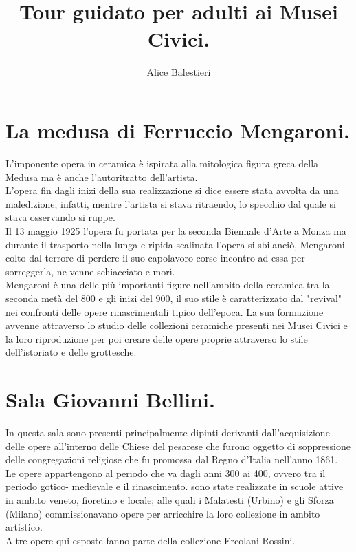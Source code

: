 \documentclass[12pt,a4paper]{article}
\begin{document}
	
	\title{\textbf{\\Tour guidato per adulti ai Musei Civici.}}
	\author{Alice Balestieri}
	\date{}
	
	\maketitle
	\newpage
	
	\tableofcontents
	\newpage
	
	\section{La medusa di Ferruccio Mengaroni.}
	L'imponente opera in ceramica è ispirata alla mitologica figura greca della Medusa ma è anche l’autoritratto dell'artista.\\
	L'opera fin dagli inizi della sua realizzazione si dice essere stata avvolta da una maledizione; infatti, mentre l'artista si stava ritraendo, lo specchio dal quale si stava osservando si ruppe.\\
	Il 13 maggio 1925 l'opera fu portata per la seconda Biennale d'Arte a Monza ma durante il trasporto nella lunga e ripida scalinata l'opera si sbilanciò, Mengaroni colto dal terrore di perdere il suo capolavoro corse incontro ad essa per sorreggerla, ne venne schiacciato e morì.\\
	Mengaroni è una delle più importanti figure nell'ambito della ceramica tra la seconda metà del 800 e gli inizi del 900, il suo stile è caratterizzato dal "revival" nei confronti delle opere rinascimentali tipico dell'epoca. La sua formazione avvenne attraverso lo studio delle collezioni ceramiche presenti nei Musei Civici e la loro riproduzione per poi creare delle opere proprie attraverso lo stile dell'istoriato e delle grottesche.
	
	\section{Sala Giovanni Bellini.}
	In questa sala sono presenti principalmente dipinti derivanti dall'acquisizione delle opere all'interno delle Chiese del pesarese che furono oggetto di soppressione delle congregazioni religiose che fu promossa dal Regno d'Italia nell'anno 1861.\\
	Le opere appartengono al periodo che va dagli anni  300 ai 400, ovvero tra il periodo gotico- medievale e il rinascimento. sono state realizzate in scuole attive in ambito veneto, fioretino e locale; alle quali i Malatesti (Urbino) e gli Sforza (Milano) commissionavano opere per arricchire la loro collezione in ambito artistico.\\
	Altre opere qui esposte fanno parte della collezione Ercolani-Rossini.
	
\end{document}
